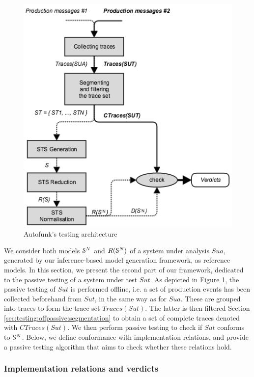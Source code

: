 \begin{figure}[ht]
\includegraphics[width=0.85\linewidth]{figures/passive_autofunk.png}

\caption{Autofunk's testing architecture}
\label{fig:passive-autofunk}
\end{figure}

We consider both models $\EuScript{S}^{N}$ and
$R(\EuScript{S}^{N})$ of a system under analysis $\mathit{Sua}$,
generated by our inference-based model generation framework, as
reference models. In this section, we present the second part of
our framework, dedicated to the passive testing of a system under
test $\mathit{Sut}$. As depicted in Figure
\ref{fig:passive-autofunk}, the passive testing of $\mathit{Sut}$
is performed offline, i.e. a set of production events has been
collected beforehand from $\mathit{Sut}$, in the same way as for
$\mathit{Sua}$. These are grouped into traces to form the trace
set $Traces({Sut})$. The latter is then filtered Section
\ref{sec:testing:offpassive:segmentation} to obtain a set of
complete traces denoted with $CTraces({Sut})$. We then perform
passive testing to check if $\mathit{Sut}$ conforms to
$\EuScript{S}^{N}$. Below, we define conformance with
implementation relations, and provide a passive testing algorithm
that aims to check whether these relations hold.

\subsubsection{Implementation relations and verdicts}

